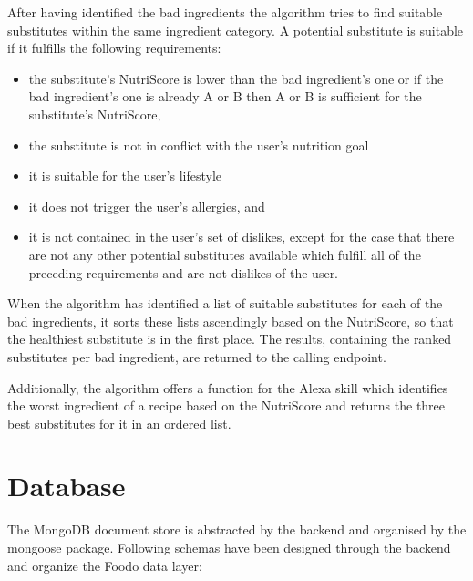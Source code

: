 \bigskip \bigskip
              
After having identified the bad ingredients the algorithm tries to find suitable substitutes within the same ingredient category. A potential substitute is suitable if it fulfills the following requirements:
\begin{itemize}
	\itemsep-0.5em 
	\item  the substitute's NutriScore is lower than the bad ingredient's one or if the bad ingredient's one is already A or B then A or B is sufficient for the substitute's NutriScore,
	\item the substitute is not in conflict with the user's nutrition goal
	\item it is suitable for the user's lifestyle
	\item it does not trigger the user's allergies, and
	\item it is not contained in the user's set of dislikes, except for the case that there are not any other potential substitutes available which fulfill all of the preceding requirements and are not dislikes of the user.
\end{itemize}
When the algorithm has identified a list of suitable substitutes for each of the bad ingredients, it sorts these lists ascendingly based on the NutriScore, so that the healthiest substitute is in the first place. The results, containing the ranked substitutes per bad ingredient, are returned to the calling endpoint.

Additionally, the algorithm offers a function for the Alexa skill which identifies the worst ingredient of a recipe based on the NutriScore and returns the three best substitutes for it in an ordered list. 

\section{Database} \label{database}
The MongoDB document store is abstracted by the backend and organised by the mongoose package. Following schemas have been designed through the backend and organize the Foodo data layer: 


